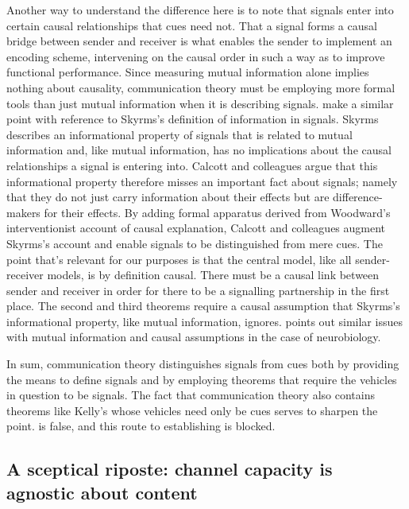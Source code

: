 \documentclass[12pt]{article}
\begin{document}
Another way to understand the difference here is to note that signals enter into certain causal relationships that cues need not.
That a signal forms a causal bridge between sender and receiver is what enables the sender to implement an encoding scheme, intervening on the causal order in such a way as to improve functional performance.
Since measuring mutual information alone implies nothing about causality, communication theory must be employing more formal tools than just mutual information when it is describing signals.
\citet{calcott2020signals} make a similar point with reference to Skyrms's \citeyearpar{skyrms2010signals} definition of information in signals.
Skyrms describes an informational property of signals that is related to mutual information and, like mutual information, has no implications about the causal relationships a signal is entering into.
Calcott and colleagues argue that this informational property therefore misses an important fact about signals; namely that they do not just carry information about their effects but are difference-makers for their effects.
By adding formal apparatus derived from Woodward's \citeyearpar{woodward2003making} interventionist account of causal explanation, Calcott and colleagues augment Skyrms's account and enable signals to be distinguished from mere cues.
The point that's relevant for our purposes is that the central model, like all sender-receiver models, is by definition causal.
There must be a causal link between sender and receiver in order for there to be a signalling partnership in the first place.
The second and third theorems require a causal assumption that Skyrms's informational property, like mutual information, ignores.
\citet{rathkopf2017neural} points out similar issues with mutual information and causal assumptions in the case of neurobiology.

In sum, communication theory distinguishes signals from cues both by providing the means to define signals and by employing theorems that require the vehicles in question to be signals.
The fact that communication theory also contains theorems like Kelly's whose vehicles need only be cues serves to sharpen the point.
\act{} is false, and this route to establishing \tic{} is blocked.

\subsection{A sceptical riposte: channel capacity is agnostic about content}
\end{document}
